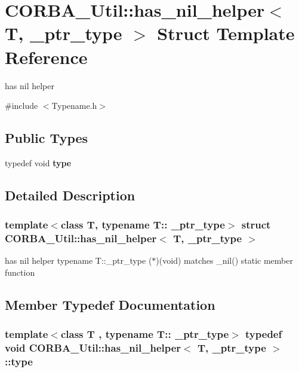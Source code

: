 \section{CORBA\_\-Util::has\_\-nil\_\-helper$<$ T, \_\-ptr\_\-type $>$ Struct Template Reference}
\label{structCORBA__Util_1_1has__nil__helper}


has nil helper  




{\ttfamily \#include $<$Typename.h$>$}

\subsection*{Public Types}
\begin{DoxyCompactItemize}
\item 
typedef void {\bf type}
\end{DoxyCompactItemize}


\subsection{Detailed Description}
\subsubsection*{template$<$class T, typename T:: \_\-ptr\_\-type$>$ struct CORBA\_\-Util::has\_\-nil\_\-helper$<$ T, \_\-ptr\_\-type $>$}

has nil helper typename T::\_\-ptr\_\-type ($\ast$)(void) matches \_\-nil() static member function 

\subsection{Member Typedef Documentation}
\subsubsection[{type}]{\setlength{\rightskip}{0pt plus 5cm}template$<$class T , typename T:: \_\-ptr\_\-type$>$ typedef void {\bf CORBA\_\-Util::has\_\-nil\_\-helper}$<$ T, \_\-ptr\_\-type $>$::{\bf type}}\label{structCORBA__Util_1_1has__nil__helper_af4f472147f8ea6648709cc87c80c08f0}
